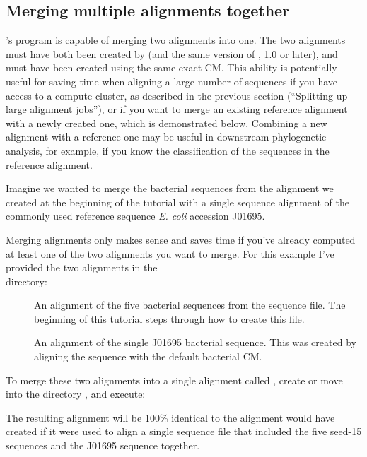 \subsection{Merging multiple alignments together}

's  program is capable of merging
two alignments into one. The two alignments must have both been
created by  (and the same version of , 1.0
or later), and must have been created using the same exact CM. This
ability is potentially useful for saving time when aligning a large
number of sequences if you have access to a compute cluster, as
described in the previous section (``Splitting up large alignment
jobs''), or if you want to merge an existing reference alignment with
a newly created one, which is demonstrated below. Combining a new
alignment with a reference one may be useful in downstream
phylogenetic analysis, for example, if you know the classification of
the sequences in the reference alignment.

Imagine we wanted to merge the bacterial sequences from the 
 alignment we created at the beginning of the tutorial
with a single sequence alignment of the commonly used reference
sequence \emph{E. coli}  accession J01695. 

Merging alignments only makes sense and saves time if you've already
computed at least one of the two alignments you want to merge. For
this example I've provided the two alignments in the \\
 directory:

\begin{description}
\item[]
  An alignment of the five bacterial sequences from the 
  sequence file. The beginning of this tutorial steps through how to create this file.

\item[]
  An alignment of the single J01695 bacterial sequence. This was
  created by aligning the sequence with the default bacterial CM.
\end{description}

To merge these two alignments into a single alignment called
, create or move
into the directory , and
execute: 


The resulting alignment will be 100\% identical to the alignment
 would have created if it were used to align a single
sequence file that included the five seed-15 sequences and the J01695
sequence together.

